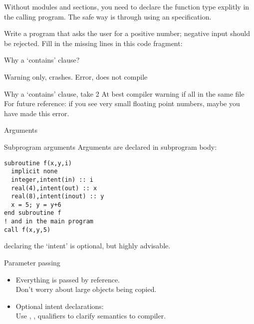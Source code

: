 \begin{f77note}
  Without modules and  sections, you need to declare the
  function type explitly in the calling program. The safe way is
  through using an  specification.
\end{f77note}

\begin{exercise}
  \label{ex:freadpos}
  Write a program that asks the user for a positive number; negative
  input should be rejected.  Fill in the missing lines in this code
  fragment:
\end{exercise}

\begin{block}{Why a `contains' clause?}
  \label{sl:whycontain}
  \begin{multicols}{2}
    Warning only, crashes.
    \vfill\columnbreak
    Error, does not compile
  \end{multicols}
\end{block}

\begin{block}{Why a `contains' clause, take 2}
  \label{sl:whycontain_type}
  At best compiler warning if all in the same file\\
  For future reference: if you see very small floating point numbers,
  maybe you have made this error.
\end{block}

 {Arguments}

\begin{block}{Subprogram arguments}
  \label{sl:farguments}
 Arguments are declared in subprogram body:
\begin{lstlisting}
subroutine f(x,y,i)
  implicit none
  integer,intent(in) :: i
  real(4),intent(out) :: x
  real(8),intent(inout) :: y
  x = 5; y = y+6
end subroutine f
! and in the main program
call f(x,y,5)
\end{lstlisting}
declaring the `intent' is optional, but highly advisable.
\end{block}

\begin{block}{Parameter passing}
  \label{sl:fpassing}
  \begin{itemize}
  \item Everything is passed by reference.\\
    Don't worry about large objects being copied.
  \item Optional intent declarations:\\
    Use , ,  qualifiers to clarify semantics
    to compiler.
  \end{itemize}
\end{block}


